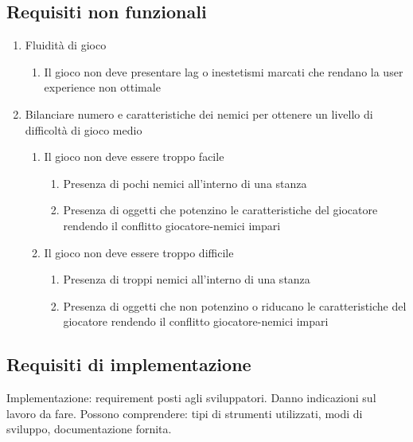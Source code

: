 \subsection{Requisiti non funzionali}

\begin{enumerate}
    \item Fluidità di gioco
    \begin{enumerate}
        \item Il gioco non deve presentare lag o inestetismi marcati che rendano la user experience non ottimale
    \end{enumerate}
    \item Bilanciare numero e caratteristiche dei nemici per ottenere un livello di difficoltà di gioco medio
    \begin{enumerate}
        \item Il gioco non deve essere troppo facile 
        \begin{enumerate}
            \item Presenza di pochi nemici all'interno di una stanza
            \item Presenza di oggetti che potenzino le caratteristiche del giocatore rendendo il conflitto giocatore-nemici impari
        \end{enumerate}
        \item Il gioco non deve essere troppo difficile
        \begin{enumerate}
            \item Presenza di troppi nemici all'interno di una stanza
            \item Presenza di oggetti che non potenzino o riducano le caratteristiche del giocatore rendendo il conflitto giocatore-nemici impari
        \end{enumerate}
    \end{enumerate}
\end{enumerate}


\subsection{Requisiti di implementazione}
Implementazione: requirement posti agli sviluppatori. Danno indicazioni 
sul lavoro da fare. Possono comprendere: tipi di strumenti utilizzati, 
modi di sviluppo, documentazione fornita.
